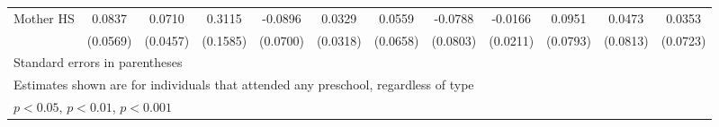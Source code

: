 \begin{table}[htbp]
\begin{tabular}{l*{11}{c}}
\addlinespace
Mother HS   &      0.0837         &      0.0710         &      0.3115\sym{*}  &     -0.0896         &      0.0329         &      0.0559         &     -0.0788         &     -0.0166         &      0.0951         &      0.0473         &      0.0353         \\
            &    (0.0569)         &    (0.0457)         &    (0.1585)         &    (0.0700)         &    (0.0318)         &    (0.0658)         &    (0.0803)         &    (0.0211)         &    (0.0793)         &    (0.0813)         &    (0.0723)         \\
\bottomrule
\multicolumn{12}{l}{\footnotesize Standard errors in parentheses}\\
\multicolumn{12}{l}{\footnotesize Estimates shown are for individuals that attended any preschool, regardless of type}\\
\multicolumn{12}{l}{\footnotesize \sym{*} \(p<0.05\), \sym{**} \(p<0.01\), \sym{***} \(p<0.001\)}\\
\end{tabular}
\end{table}
